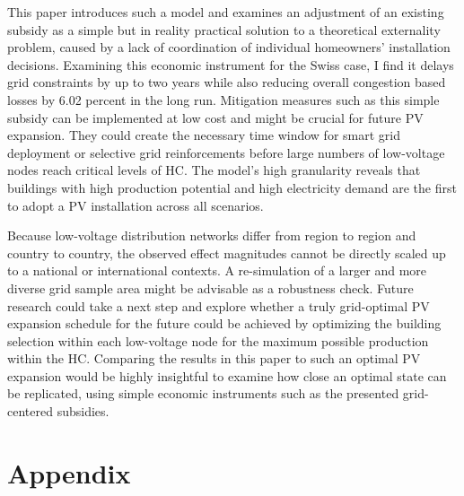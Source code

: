\documentclass[12PT, ]{article}
\begin{document}
This paper introduces such a model and examines an adjustment of an existing subsidy as a simple but in reality practical solution to a theoretical externality problem, caused by a lack of coordination of individual homeowners' installation decisions.    
Examining this economic instrument for the Swiss case, I find it delays grid constraints by up to two years while also reducing overall congestion based losses  by 6.02 percent in the long run. 
Mitigation measures such as this simple subsidy can be implemented at low cost and might be crucial for future PV expansion. 
They could create the necessary time window for smart grid deployment or selective grid reinforcements before large numbers of low-voltage nodes reach critical levels of HC.
The model's high granularity reveals that buildings with high production potential and high electricity demand are the first to adopt a PV installation across all scenarios.


Because low-voltage distribution networks differ from region to region and country to country, the observed effect magnitudes cannot be directly scaled up to a national or international contexts.
A re-simulation of a larger and more diverse grid sample area might be advisable as a robustness check. 
Future research could take a next step and explore whether a truly grid-optimal PV expansion schedule for the future could be achieved by optimizing the building selection within each low-voltage node for the maximum possible production within the HC. Comparing the results in this paper to such an optimal PV expansion would be highly insightful to examine how close an optimal state can be replicated, using simple economic instruments such as the presented grid-centered subsidies. 



\printbibliography

\newpage
\section*{Appendix} \label{sec:}%
\renewcommand{\thesection}{\Alph{section}}
\setcounter{section}{1}
\setcounter{subsection}{0}
\setcounter{figure}{0}
\setcounter{table}{0}
\end{document}
